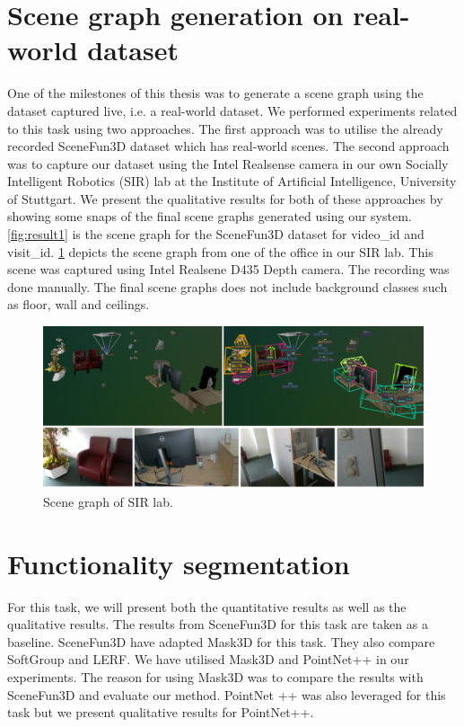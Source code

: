 \section{Scene graph generation on real-world dataset}
\label{sec:SG}
One of the milestones of this thesis was to generate a scene graph using the dataset captured live, i.e. a real-world dataset. We performed experiments related to
 this task using two approaches. The first approach was to utilise the already recorded SceneFun3D dataset which has real-world scenes. The second approach was 
to capture our dataset using the Intel Realsense camera in our own Socially Intelligent Robotics (SIR) lab at the Institute of Artificial Intelligence, 
University of Stuttgart. We present the qualitative results for both of these approaches by showing some snaps of the final scene graphs generated 
using our system. \cref{fig:result1} is the scene graph for the SceneFun3D dataset for video\_id and visit\_id. \cref{fig:result2} 
depicts the scene graph from one of the office in our SIR lab. This scene was captured using Intel Realsene D435 Depth camera. The recording was done manually.
The final scene graphs does not include background classes such as  floor, wall and ceilings.

\begin{figure}[ht!]
    \centering
    \includegraphics[width=\textwidth]{content/images/results/SIR_SG.png}
    \caption{Scene graph of SIR lab.}
    \label{fig:result2}
\end{figure}
\section{Functionality segmentation}
\label{sec:FS}
For this task, we will present both the quantitative results as well as the qualitative results. The results from SceneFun3D for this task are taken as a baseline. 
SceneFun3D have adapted Mask3D for this task. They also compare SoftGroup and LERF. We have utilised Mask3D and PointNet++ in our experiments. The reason for using 
Mask3D was to compare the results with SceneFun3D and evaluate our method. PointNet ++ was also leveraged for this task but we present qualitative results for PointNet++.

